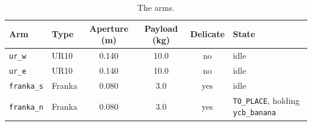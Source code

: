 \begin{table}[H]
\centering
\caption{The arms.}
\label{tab:appendix:arms}
\begin{tabular}{llcccl}
\toprule
Arm & Type & Aperture (m) & Payload (kg) & Delicate & State \\
\midrule
\texttt{ur\_w} & UR10 & 0.140 & 10.0 & no & idle \\
\texttt{ur\_e} & UR10 & 0.140 & 10.0 & no & idle \\
\texttt{franka\_s} & Franka & 0.080 & 3.0 & yes & idle \\
\texttt{franka\_n} & Franka & 0.080 & 3.0 & yes & \texttt{TO\_PLACE}, holding \texttt{ycb\_banana} \\
\bottomrule
\end{tabular}
\end{table}
